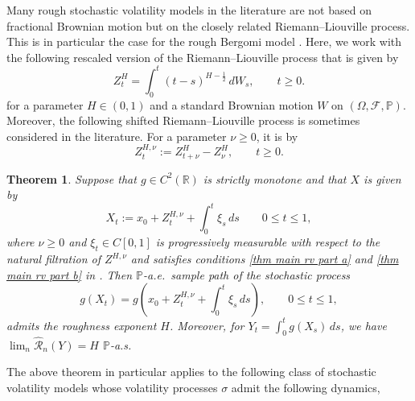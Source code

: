 \documentclass[12pt,reqno]{article}
\def\ua{\uparrow}
\def\wh{\widehat}
\numberwithin{equation}{section}
\def\cF{{\mathscr F}}
\def\cR{{\mathscr R}}
\newtheorem{theorem}{Theorem}[section]
\theoremstyle{definition}
\def\ua{\uparrow}
\def\wh{\widehat}
\newcommand{\bR}{\mathbb{R}}
\newcommand{\bP}{\mathbb{P}}
\begin{document}
Many rough stochastic volatility models in the literature are not based on fractional Brownian motion but on the closely related Riemann--Liouville process. This is in particular the case for the  rough Bergomi model \cite{Forde2022}. Here, we work with the following rescaled version of the Riemann--Liouville process that is given by 
\begin{equation*}
	Z^H_t = \int_0^t (t-s)^{H-\frac{1}{2}}\,dW_s, \qquad t \ge 0. 
\end{equation*}
for a parameter $H\in(0,1)$ and a standard Brownian motion $W$ on $(\Omega,\cF,\bP)$. Moreover, the following shifted Riemann--Liouville process is sometimes considered in the literature. For a parameter  $\nu \ge 0$, it is by 
$$Z^{H,\nu}_t := Z^H_{t + \nu} - Z^H_\nu,\qquad t \ge 0.$$

\begin{theorem}\label{Thm Rough Bergomi}
	Suppose that $g \in C^2(\bR)$ is strictly monotone and that $X$ is given by 
	\begin{equation}\label{eq RL with drift}
		X_t := x_0 + Z^{H,\nu} _t+  \int_{0}^{t}\xi_s \, ds \qquad 0 \le t \le 1,
	\end{equation}
	where $\nu\ge0$ and $\xi_t \in C[0,1]$ is progressively measurable with respect to the natural filtration of $Z^{H,\nu}$ and satisfies conditions \ref{thm main rv part a} and \ref{thm main rv part b} in .
Then $\bP$-a.e.~sample path of the stochastic process
	\begin{equation*}
		g(X_t) = g\left(x_0 + Z^{H,\nu} _t + \int_{0}^{t}\xi_s \,ds\right), \qquad 0 \le t \le 1,
	\end{equation*}
	admits the roughness exponent $H$. Moreover, for $Y_t = \int_0^t g(X_s)\,ds$, we have $\lim_n \wh \cR_n(Y) = H$ $\bP$-a.s.
\end{theorem}
The above theorem in particular applies to the following class of stochastic volatility models whose volatility processes $\sigma$ admit the following dynamics,
\end{document}
